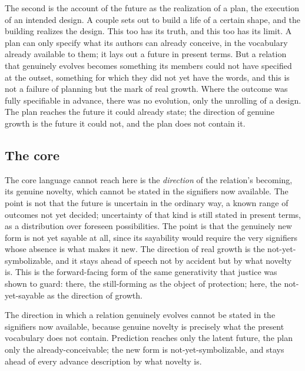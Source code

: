 The second is the account of the future as the realization of a plan, the execution of an intended design. A couple sets out to build a life of a certain shape, and the building realizes the design. This too has its truth, and this too has its limit. A plan can only specify what its authors can already conceive, in the vocabulary already available to them; it lays out a future in present terms. But a relation that genuinely evolves becomes something its members could not have specified at the outset, something for which they did not yet have the words, and this is not a failure of planning but the mark of real growth. Where the outcome was fully specifiable in advance, there was no evolution, only the unrolling of a design. The plan reaches the future it could already state; the direction of genuine growth is the future it could not, and the plan does not contain it.

\subsection*{The core}

The core language cannot reach here is the \emph{direction} of the relation's becoming, its genuine novelty, which cannot be stated in the signifiers now available. The point is not that the future is uncertain in the ordinary way, a known range of outcomes not yet decided; uncertainty of that kind is still stated in present terms, as a distribution over foreseen possibilities. The point is that the genuinely new form is not yet sayable at all, since its sayability would require the very signifiers whose absence is what makes it new. The direction of real growth is the not-yet-symbolizable, and it stays ahead of speech not by accident but by what novelty is. This is the forward-facing form of the same generativity that justice was shown to guard: there, the still-forming as the object of protection; here, the not-yet-sayable as the direction of growth.

\begin{claim}
The direction in which a relation genuinely evolves cannot be stated in the signifiers now available, because genuine novelty is precisely what the present vocabulary does not contain. Prediction reaches only the latent future, the plan only the already-conceivable; the new form is not-yet-symbolizable, and stays ahead of every advance description by what novelty is.
\end{claim}

